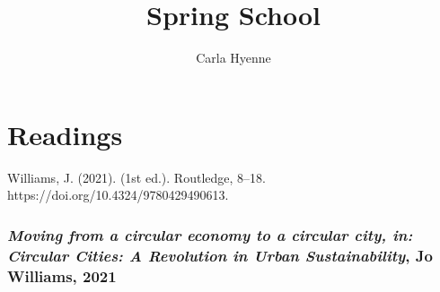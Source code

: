 \documentclass{article}
\title{Spring School}
\author{Carla Hyenne}
\begin{document}
\maketitle

\tableofcontents

\pagebreak

\section{Readings}


Williams, J. (2021).  (1st ed.). Routledge, 8–18. https://doi.org/10.4324/9780429490613.

\subsubsection{\textit{Moving from a circular economy to a circular city, in: Circular Cities: A Revolution in Urban Sustainability}, Jo Williams, 2021}
\end{document}
